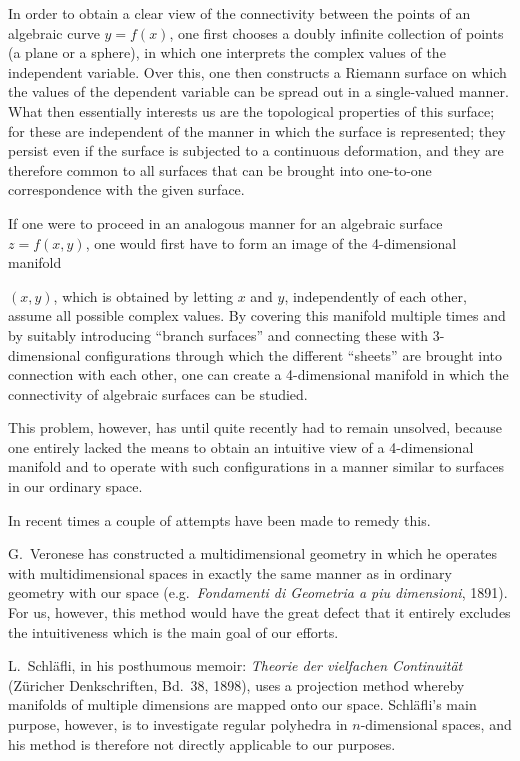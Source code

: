 \documentclass{article}
\begin{document}
In order to obtain a clear view of the connectivity between the points of an algebraic curve $y = f(x)$, one first chooses a doubly infinite collection of points (a plane or a sphere), in which one interprets the complex values of the independent variable. Over this, one then constructs a Riemann surface on which the values of the dependent variable can be spread out in a single-valued manner. What then essentially interests us are the topological properties of this surface; for these are independent of the manner in which the surface is represented; they persist even if the surface is subjected to a continuous deformation, and they are therefore common to all surfaces that can be brought into one-to-one correspondence with the given surface.

If one were to proceed in an analogous manner for an algebraic surface $z = f(x, y)$, one would first have to form an image of the 4-dimensional manifold

$(x, y)$, which is obtained by letting $x$ and $y$, independently of each other, assume all possible complex values. By covering this manifold multiple times and by suitably introducing “branch surfaces” and connecting these with 3-dimensional configurations through which the different “sheets” are brought into connection with each other, one can create a 4-dimensional manifold in which the connectivity of algebraic surfaces can be studied.

This problem, however, has until quite recently had to remain unsolved, because one entirely lacked the means to obtain an intuitive view of a 4-dimensional manifold and to operate with such configurations in a manner similar to surfaces in our ordinary space.

In recent times a couple of attempts have been made to remedy this.

G.~Veronese has constructed a multidimensional geometry in which he operates with multidimensional spaces in exactly the same manner as in ordinary geometry with our space (e.g.\ \emph{Fondamenti di Geometria a piu dimensioni}, 1891). For us, however, this method would have the great defect that it entirely excludes the intuitiveness which is the main goal of our efforts.

L.~Schläfli, in his posthumous memoir: \emph{Theorie der vielfachen Continuität} (Züricher Denkschriften, Bd.~38, 1898), uses a projection method whereby manifolds of multiple dimensions are mapped onto our space. Schläfli's main purpose, however, is to investigate regular polyhedra in $n$-dimensional spaces, and his method is therefore not directly applicable to our purposes.
\end{document}

